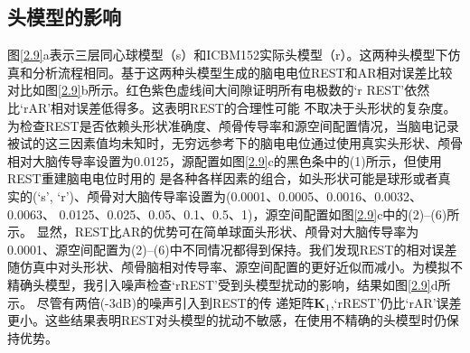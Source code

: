 \subsection{头模型的影响}
\label{ch:head-model-disturbance}
图\ref{2.9}a表示三层同心球模型（s）和ICBM152实际头模型（r）。这两种头模型下仿真和分析流程相同。基于这两种头模型生成的脑电电位REST和AR相对误差比较对比如图\ref{2.9}b所示。红色紫色虚线间大间隙证明所有电极数的‘r REST’依然比‘rAR’相对误差低得多。这表明REST的合理性可能
不取决于头形状的复杂度。 为检查REST是否依赖头形状准确度、颅骨传导率和源空间配置情况，当脑电记录被试的这三因素值均未知时，无穷远参考下的脑电电位通过使用真实头形状、颅骨相对大脑传导率设置为0.0125，源配置如图\ref{2.9}c的黑色条中的(1)所示，但使用REST重建脑电电位时用的
是各种各样因素的组合，如头形状可能是球形或者真实的(‘s’, ‘r’)、颅骨对大脑传导率设置为(0.0001、0.0005、0.0016、0.0032、0.0063、
0.0125、0.025、0.05、0.1、0.5、1)，源空间配置如图\ref{2.9}c中的(2)–(6)所示。 显然，REST比AR的优势可在简单球面头形状、颅骨对大脑传导率为0.0001、源空间配置为(2)–(6)中不同情况都得到保持。我们发现REST的相对误差随仿真中对头形状、颅骨脑相对传导率、源空间配置的更好近似而减小。为模拟不精确头模型，我引入噪声检查‘rREST’受到头模型扰动的影响，结果如图\ref{2.9}d所示。 尽管有两倍(-3dB)的噪声引入到REST的传
递矩阵$\mathbf{K}_1$,‘rREST’仍比‘rAR’误差更小。这些结果表明REST对头模型的扰动不敏感，在使用不精确的头模型时仍保持优势。
